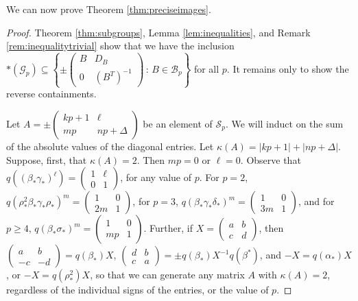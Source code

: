 \documentclass{amsart}     %
\newcommand{\set}[1]{ \left\{ #1 \right\} }
\theoremstyle{definition}
\begin{document}
We can now prove Theorem \ref{thm:preciseimages}.
\begin{proof}
Theorem \ref{thm:subgroups}, Lemma \ref{lem:inequalities}, and Remark \ref{rem:inequalitytrivial} show that we have the inclusion $*(\mathcal{G}_p) \subseteq \set{ \pm \begin{pmatrix} B & D_B \\ 0 & (B^T)^{-1} \end{pmatrix} \, : \, B \in \mathcal{B}_p}$ for all $p$. It remains only to show the reverse containments. 

Let $A =  \pm \begin{pmatrix} kp+1 & \ell \\ mp & np + \Delta \end{pmatrix}$ be an element of $\mathcal{S}_p$. We will induct on the sum of the absolute values of the diagonal entries. Let $\kappa(A) = |kp + 1| + |np + \Delta|$. Suppose, first, that $\kappa(A) = 2$. Then $mp = 0$ or $\ell = 0$. Observe that $q((\beta_* \gamma_*)^\ell) = \begin{pmatrix} 1 & \ell \\ 0 & 1 \end{pmatrix}$, for any value of $p$. For $p = 2$, $q(\rho_*^2 \beta_* \gamma_* \rho_*)^m = \begin{pmatrix} 1 & 0 \\ 2m & 1 \end{pmatrix}$, for $p = 3$, $q(\beta_*\gamma_*\delta_*)^m = \begin{pmatrix} 1 & 0 \\ 3m & 1 \end{pmatrix}$, and for $p \geq 4$, $q(\beta_* \sigma_*)^m = \begin{pmatrix} 1 & 0 \\ mp & 1 \end{pmatrix}$. Further, if $X = \begin{pmatrix} a & b \\ c & d \end{pmatrix}$, then $\begin{pmatrix} a & b \\ -c & -d \end{pmatrix} = q(\beta_*)X$, $\begin{pmatrix} d & b \\ c & a \end{pmatrix} = \pm q(\beta_*)X^{-1}q(\beta^*)$, and $-X = q(\alpha_*)X$, or $-X = q(\rho_*^2)X$, so that we can generate any matrix $A$ with $\kappa(A) = 2$, regardless of the individual signs of the entries, or the value of $p$.


\end{proof}
\end{document}
